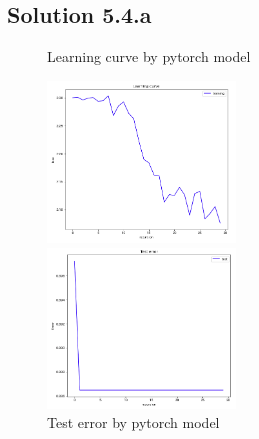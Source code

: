 \documentclass[a4paper]{article}
\theoremstyle{definition}
\newenvironment{soln}{
	\leavevmode\color{blue}\ignorespaces
}{}
\begin{document}
	\subsection*{Solution 5.4.a}	
	\begin{soln}
\begin{figure}[htbp]
\begin{minipage}{0.5\hsize}
\begin{center}
\caption{Learning curve by pytorch model}
\includegraphics[width=50mm]{./img/my_lc_a.png}
\end{center}
\captionsetup{labelformat=empty}
\end{minipage}
\begin{minipage}{0.5\hsize}
\begin{center}
\caption{Test error by pytorch model}
\includegraphics[width=50mm]{./img/my_er_a.png}
\end{center}
\captionsetup{labelformat=empty}
\end{minipage}
\end{figure}

	\end{soln}
\end{document}
